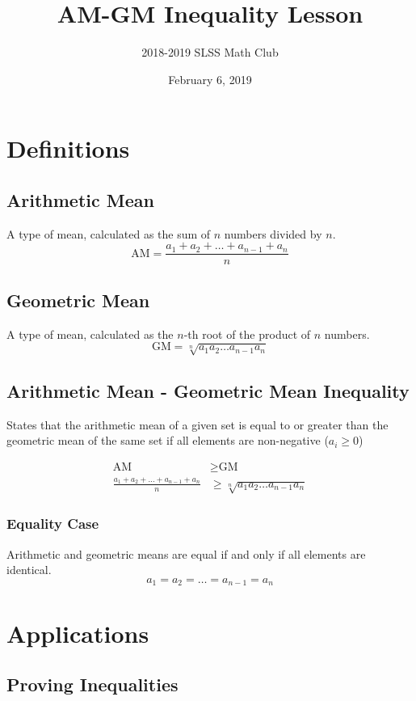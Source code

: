 \documentclass[12pt]{article}
\title{AM-GM Inequality Lesson\vspace{-3mm}}
\author{2018-2019 SLSS Math Club\vspace{-5mm}}
\date{February 6, 2019\vspace{-5mm}}
\begin{document}
\maketitle

\section{Definitions}
\subsection{Arithmetic Mean}
A type of mean, calculated as the sum of $n$ numbers divided by $n$.
$$\text{AM} = \frac{a_{1} + a_{2} + \dots + a_{n - 1} + a_{n}}{n}$$

\subsection{Geometric Mean}
A type of mean, calculated as the $n$-th root of the product of $n$ numbers. $$\text{GM} = \sqrt[n]{a_{1} a_{2} \dots a_{n - 1} a_{n}}$$

\subsection{Arithmetic Mean - Geometric Mean Inequality}
States that the arithmetic mean of a given set is equal to or greater than the geometric mean of the same set if all elements are non-negative ($a_i \geq 0$)

\begin{align*}
    \text{AM} & \geq \text{GM} \\
     \frac{a_{1} + a_{2} + \dots + a_{n - 1} + a_{n}}{n} & \geq \sqrt[n]{a_{1} a_{2} \dots a_{n - 1} a_{n}}
\end{align*}

\subsubsection*{Equality Case}
Arithmetic and geometric means are equal if and only if all elements are identical. $$a_{1} = a_{2} = \dots = a_{n - 1} = a_{n}$$

\newpage

\section{Applications}
\subsection{Proving Inequalities}
\end{document}
